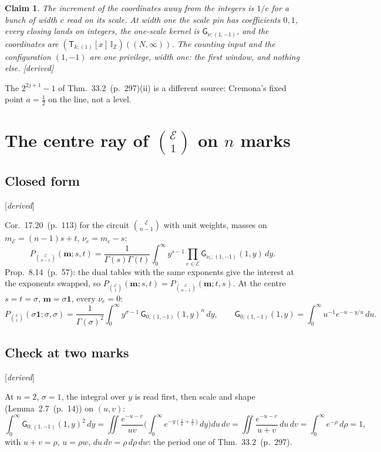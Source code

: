\documentclass[11pt]{article}
\newcommand{\cE}{\mathcal E}
\newcommand{\one}{\mathbf 1}
\newcommand{\mvec}{\mathbf m}
\newcommand{\sG}{\mathsf G}
\newcommand{\sT}{\mathsf T}
\newcommand{\IZ}{\mathbb I_{\mathbb Z}}
\newcommand{\Tx}[3]{(\sT_{#1;(1)}[x]\,#2)((#3,\infty))}
\newcommand{\status}[1]{\hfill{\small[\textit{#1}]}}
\newcommand{\hb}[2]{#1~(p.~#2)}   %
\theoremstyle{plain}
\newtheorem{claim}{Claim}[section]
\theoremstyle{remark}
\begin{document}
\begin{claim}\label{cl:width}
The increment of the coordinates away from the integers is $1/c$ for a bunch of width $c$ read on its scale. At width one the scale pin has coefficients $0,1$, every closing lands on integers, the one-scale kernel is $\sG_{\nu;(1,-1)}$, and the coordinates are $\Tx{k}{\IZ}{N}$. The counting input and the configuration $(1,-1)$ are one privilege, width one: the first window, and nothing else. \status{derived}
\end{claim}

The $2^{2j+1}-1$ of Thm.~\hb{33.2}{297}(ii) is a different source: Cremona's fixed point $a=\frac12$ on the line, not a level.

\section{The centre ray of $\binom{\cE}1$ on $n$ marks}

\subsection{Closed form}\status{derived}

Cor.~\hb{17.20}{113} for the circuit $\binom{\cE}{n-1}$ with unit weights, masses on $m_{\cE}=(n-1)s+t$, $\nu_e=m_e-s$:
\[
P_{\binom{\cE}{n-1}}(\mvec;s,t)=\frac1{\Gamma(s)\Gamma(t)}\int_0^\infty y^{s-1}\prod_{e\in\cE}\sG_{\nu_e;(1,-1)}(1,y)\,dy .
\]
Prop.~\hb{8.14}{57}: the dual tables with the same exponents give the interest at the exponents swapped, so $P_{\binom{\cE}1}(\mvec;s,t)=P_{\binom{\cE}{n-1}}(\mvec;t,s)$. At the centre $s=t=\sigma$, $\mvec=\sigma\one$, every $\nu_e=0$:
\[
P_{\binom{\cE}1}(\sigma\one;\sigma,\sigma)=\frac1{\Gamma(\sigma)^2}\int_0^\infty y^{\sigma-1}\,\sG_{0;(1,-1)}(1,y)^n\,dy,\qquad \sG_{0;(1,-1)}(1,y)=\int_0^\infty u^{-1}e^{-u-y/u}\,du .
\]

\subsection{Check at two marks}\status{derived}

At $n=2$, $\sigma=1$, the integral over $y$ is read first, then scale and shape (Lemma~\hb{2.7}{14}) on $(u,v)$:
\[
\int_0^\infty\sG_{0;(1,-1)}(1,y)^2\,dy=\iint\frac{e^{-u-v}}{uv}\Big(\int_0^\infty e^{-y(\frac1u+\frac1v)}dy\Big)du\,dv=\iint\frac{e^{-u-v}}{u+v}\,du\,dv=\int_0^\infty e^{-\rho}\,d\rho=1,
\]
with $u+v=\rho$, $u=\rho w$, $du\,dv=\rho\,d\rho\,dw$: the period one of Thm.~\hb{33.2}{297}.
\end{document}
